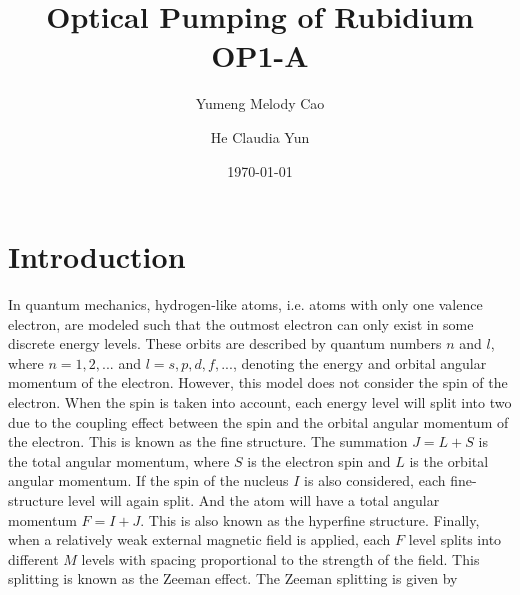 \documentclass[prb,preprint]{revtex4-1}
\begin{document}
\title{Optical Pumping of Rubidium OP1-A}

\author{Yumeng Melody Cao}
\author{He Claudia Yun}


\date{\today}


\begin{abstract}

\end{abstract}

\maketitle 

\section{Introduction}

In quantum mechanics, hydrogen-like atoms, i.e. atoms with only one valence electron, are modeled such that the outmost electron can only exist in some discrete energy levels. These orbits are described by quantum numbers $n$ and $l$, where $n=1, 2, ...$ and $l=s, p, d, f, ...$, denoting the energy and orbital angular momentum of the electron. However, this model does not consider the spin of the electron. When the spin is taken into account, each energy level will split into two due to the coupling effect between the spin and the orbital angular momentum of the electron. This is known as the fine structure. The summation $J=L+S$ is the total angular momentum, where $S$ is the electron spin and $L$ is the orbital angular momentum. If the spin of the nucleus $I$ is also considered, each fine-structure level will again split. And the atom will have a total angular momentum $F=I+J$. This is also known as the hyperfine structure. Finally, when a relatively weak external magnetic field is applied, each $F$ level splits into different $M$ levels with spacing proportional to the strength of the field. This splitting is known as the Zeeman effect. The Zeeman splitting is given by
\end{document}
